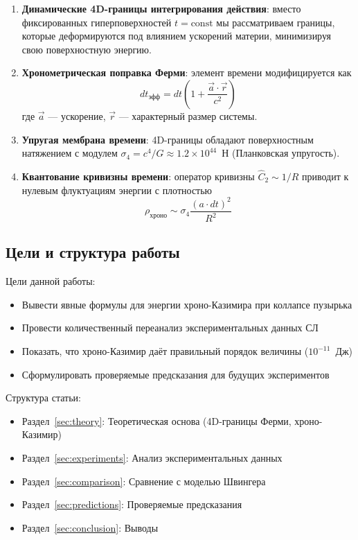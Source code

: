 \documentclass[12pt,a4paper]{article}
\begin{document}
\begin{enumerate}
    \item \textbf{Динамические 4D-границы интегрирования действия}: вместо фиксированных гиперповерхностей $t = \text{const}$ мы рассматриваем границы, которые деформируются под влиянием ускорений материи, минимизируя свою поверхностную энергию.
    
    \item \textbf{Хронометрическая поправка Ферми}: элемент времени модифицируется как
    \begin{equation}
    dt_{\text{эфф}} = dt\left(1 + \frac{\vec{a}\cdot\vec{r}}{c^2}\right)
    \end{equation}
    где $\vec{a}$ — ускорение, $\vec{r}$ — характерный размер системы.
    
    \item \textbf{Упругая мембрана времени}: 4D-границы обладают поверхностным натяжением с модулем $\sigma_4 = c^4/G \approx 1.2 \times 10^{44}$~Н (Планковская упругость).
    
    \item \textbf{Квантование кривизны времени}: оператор кривизны $\hat{C}_2 \sim 1/R$ приводит к нулевым флуктуациям энергии с плотностью
    \begin{equation}
    \rho_{\text{хроно}} \sim \sigma_4 \frac{(a \cdot dt)^2}{R^2}
    \end{equation}
\end{enumerate}

\subsection{Цели и структура работы}

Цели данной работы:
\begin{itemize}
    \item Вывести явные формулы для энергии хроно-Казимира при коллапсе пузырька
    \item Провести количественный переанализ экспериментальных данных СЛ
    \item Показать, что хроно-Казимир даёт правильный порядок величины ($10^{-11}$~Дж)
    \item Сформулировать проверяемые предсказания для будущих экспериментов
\end{itemize}

Структура статьи:
\begin{itemize}
    \item Раздел~\ref{sec:theory}: Теоретическая основа (4D-границы Ферми, хроно-Казимир)
    \item Раздел~\ref{sec:experiments}: Анализ экспериментальных данных
    \item Раздел~\ref{sec:comparison}: Сравнение с моделью Швингера
    \item Раздел~\ref{sec:predictions}: Проверяемые предсказания
    \item Раздел~\ref{sec:conclusion}: Выводы
\end{itemize}
\end{document}
